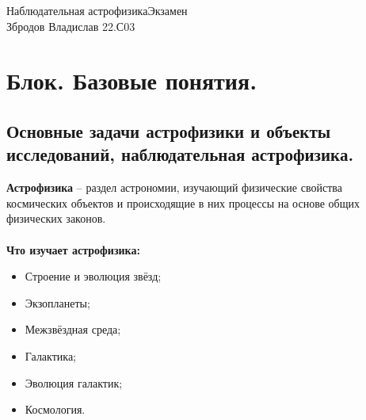\documentclass[12pt]{article}
\begin{document}
	\noindent Наблюдательная астрофизика\hfill Экзамен\\
	Збродов Владислав 22.С03
	
	\hrulefill
	\section{Блок. Базовые понятия.}
	\subsection{Основные задачи астрофизики и объекты исследований, наблюдательная астрофизика.}
	\textbf{Астрофизика} – раздел астрономии, изучающий физические
	свойства космических объектов и происходящие в них процессы на
	основе общих физических законов.\\
	\\
	\textbf{Что изучает астрофизика:}
	\begin{itemize}
	\item	Строение и эволюция звёзд;
	\item Экзопланеты;
	\item Межзвёздная среда;
	\item Галактика;
	\item Эволюция галактик;
	\item Космология.
	\end{itemize}
	
\end{document}
